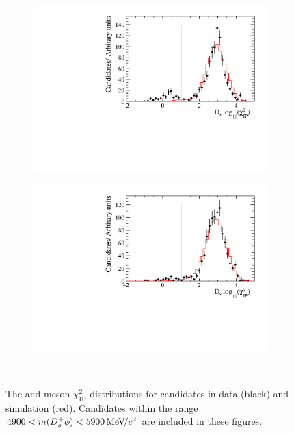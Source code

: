 \begin{figure}[!h]
\begin{subfigure}[t]{0.32\textwidth}
      \includegraphics[width=1.0\textwidth]{figs/Selection/Data_MC_Comparison_Var_2_B2DsPhi_Ds2PiPiPi.pdf}
      \caption{\decay{\Dsp}{\pip\pim\pip}}
   \end{subfigure}
   \begin{subfigure}[t]{0.32\textwidth}
      \centering
      \includegraphics[width=1.0\textwidth]{figs/Selection/Data_MC_Comparison_Var_2_B2DsPhi_Ds2KPiPi.pdf}
      \caption{\decay{\Dsp}{\Kp\pim\pip}}
   \end{subfigure}\\
   \caption{The \Bp and \Dsp meson $\chi^{2}_{\text{IP}}$ distributions for \decay{\Bp}{\Dsp\phiz} candidates in data (black) and simulation (red). Candidates within the range $4900 < m({{D}^+_{s}}\phi) < 5900 {\mathrm{\,Me\kern -0.1em V\!/}c^2}$ are included in these figures.}
   \label{fig:ipchi2dist_signal}   
\end{figure}

